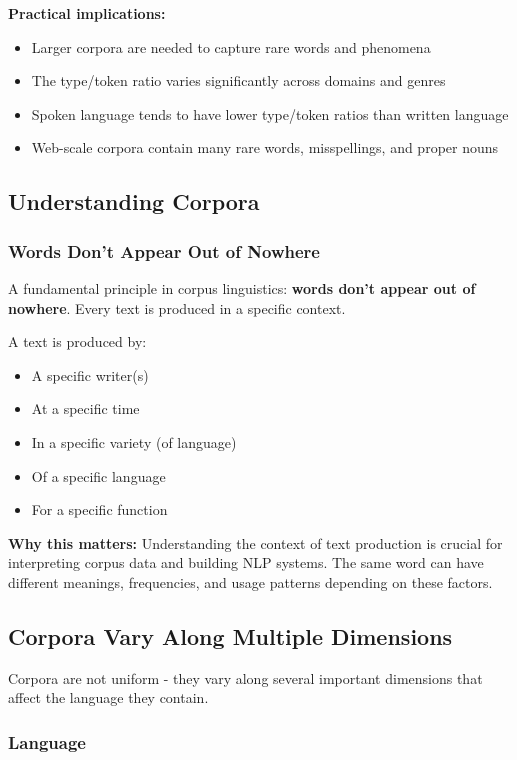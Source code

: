\documentclass[11pt,a4paper]{article}
\theoremstyle{definition}
\theoremstyle{plain}
\theoremstyle{remark}
\begin{document}
\textbf{Practical implications:}
\begin{itemize}
    \item Larger corpora are needed to capture rare words and phenomena
    \item The type/token ratio varies significantly across domains and genres
    \item Spoken language tends to have lower type/token ratios than written language
    \item Web-scale corpora contain many rare words, misspellings, and proper nouns
\end{itemize}

\subsection{Understanding Corpora}

\subsubsection{Words Don't Appear Out of Nowhere}

A fundamental principle in corpus linguistics: \textbf{words don't appear out of nowhere}. Every text is produced in a specific context.

A text is produced by:
\begin{itemize}
    \item A specific writer(s)
    \item At a specific time
    \item In a specific variety (of language)
    \item Of a specific language
    \item For a specific function
\end{itemize}

\textbf{Why this matters:} Understanding the context of text production is crucial for interpreting corpus data and building NLP systems. The same word can have different meanings, frequencies, and usage patterns depending on these factors.

\subsection{Corpora Vary Along Multiple Dimensions}

Corpora are not uniform - they vary along several important dimensions that affect the language they contain.

\subsubsection{Language}
\end{document}
